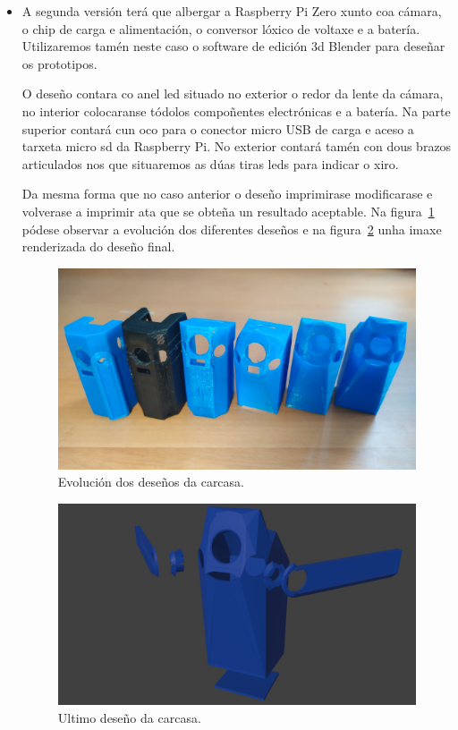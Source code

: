 \begin{itemize}
    \item A segunda versión terá que albergar a Raspberry Pi Zero xunto coa cámara, o chip de carga e alimentación, o conversor lóxico de voltaxe e a batería. Utilizaremos tamén neste caso o software de edición 3d Blender para deseñar os prototipos.

    O deseño contara co anel led situado no exterior o redor da lente da cámara, no interior colocaranse tódolos compoñentes electrónicas e a batería. Na parte superior contará cun oco para o conector micro USB de carga e aceso a tarxeta micro sd da Raspberry Pi. No exterior contará tamén con dous brazos articulados nos que situaremos as dúas tiras leds para indicar o xiro.

    Da mesma forma que no caso anterior o deseño imprimirase modificarase e volverase a imprimir ata que se obteña un resultado aceptable. Na figura~\ref{fig:evolucion_carcasa} pódese observar a evolución dos diferentes deseños e na figura~\ref{fig:carcasa} unha imaxe renderizada do deseño final.


    \begin{figure}[tb]
      \centering
      \includegraphics[scale=.1]{imaxes/evolucion-carcasa.jpg}
      \caption{Evolución dos deseños da carcasa.}
      \label{fig:evolucion_carcasa}
    \end{figure}

    \begin{figure}[tb]
      \centering
      \includegraphics[scale=.4]{imaxes/carcasa.png}
      \caption{Ultimo deseño da carcasa.}
      \label{fig:carcasa}
    \end{figure}
\end{itemize}
